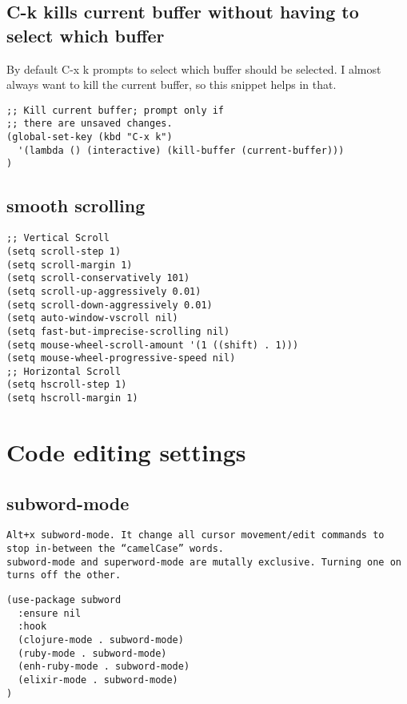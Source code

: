 \documentclass[11pt]{article}
\begin{document}
\subsection*{C-k kills current buffer without having to select which buffer}
\label{sec:orge7ef2c3}

By default C-x k prompts to select which buffer should be selected.
I almost always want to kill the current buffer, so this snippet helps in that.
\begin{verbatim}
;; Kill current buffer; prompt only if
;; there are unsaved changes.
(global-set-key (kbd "C-x k")
  '(lambda () (interactive) (kill-buffer (current-buffer)))
)
\end{verbatim}

\subsection*{smooth scrolling}
\label{sec:org6c83eba}

\begin{verbatim}
;; Vertical Scroll
(setq scroll-step 1)
(setq scroll-margin 1)
(setq scroll-conservatively 101)
(setq scroll-up-aggressively 0.01)
(setq scroll-down-aggressively 0.01)
(setq auto-window-vscroll nil)
(setq fast-but-imprecise-scrolling nil)
(setq mouse-wheel-scroll-amount '(1 ((shift) . 1)))
(setq mouse-wheel-progressive-speed nil)
;; Horizontal Scroll
(setq hscroll-step 1)
(setq hscroll-margin 1)
\end{verbatim}


\section*{Code editing settings}
\label{sec:orge8e07ad}
\subsection*{subword-mode}
\label{sec:org52e6b24}

\begin{verbatim}
Alt+x subword-mode. It change all cursor movement/edit commands to stop in-between the “camelCase” words.
subword-mode and superword-mode are mutally exclusive. Turning one on turns off the other.
\end{verbatim}


\begin{verbatim}
(use-package subword
  :ensure nil
  :hook
  (clojure-mode . subword-mode)
  (ruby-mode . subword-mode)
  (enh-ruby-mode . subword-mode)
  (elixir-mode . subword-mode)
)
\end{verbatim}
\end{document}
